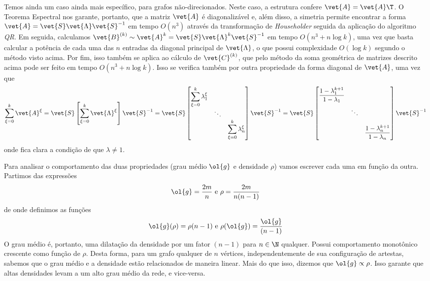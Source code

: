 \documentclass[l15, tikzdraw]{homework}
\begin{document}
	Temos ainda um caso ainda mais específico, para grafos não-direcionados. Neste caso, a estrutura confere $\vet{A} = \vet{A}\T$. O Teorema Espectral nos garante, portanto, que a matriz $\vet{A}$ é diagonalizável e, além disso, a simetria permite encontrar a forma $\vet{A} = \vet{S} \vet{\Lambda} \vet{S}^{-1}$ em tempo $O(n^3)$ através da transformação de \textit{Householder} seguida da aplicação do algoritmo \textit{QR}. Em seguida, calculamos $\vet{B}^{(k)} \sim \vet{A}^k = \vet{S} \vet{\Lambda}^k \vet{S}^{-1}$ em tempo $O(n^3 + n \log k)$, uma vez que basta calcular a potência de cada uma das $n$ entradas da diagonal principal de $\vet{\Lambda}$, o que possui complexidade $O(\log k)$ segundo o método visto acima. Por fim, isso também se aplica ao cálculo de $\vet{C}^{(k)}$, que pelo método da soma geométrica de matrizes descrito acima pode ser feito em tempo $O(n^3 + n \log k)$. Isso se verifica também por outra propriedade da forma diagonal de $\vet{A}$, uma vez que
		$$\sum_{\xi = 0}^{k} \vet{A}^\xi = \vet{S} \left[ \sum_{\xi = 0}^{k} \vet{\Lambda}^\xi \right]\vet{S}^{-1} = \vet{S} \left[ \begin{matrix}%
			\displaystyle \sum_{\xi = 0}^{k} \lambda_1^\xi & ~ & ~ \\
			~ & \ddots & ~ \\
			~ & ~ & \displaystyle \sum_{\xi = 0}^{k} \lambda_n^\xi%
		\end{matrix} \right]\vet{S}^{-1} = \vet{S} \left[ \begin{matrix}%
			\displaystyle \frac{1 - \lambda_1^{k + 1}}{1 - \lambda_1} & ~ & ~ \\[2.5ex]
			~ & \ddots & ~ \\[2.5ex]
			~ & ~ & \displaystyle \frac{1 - \lambda_n^{k + 1}}{1 - \lambda_n}%
		\end{matrix} \right]\vet{S}^{-1}$$
	onde fica clara a condição de que $\lambda \neq 1$.


	Para analisar o comportamento das duas propriedades (grau médio $\ol{g}$ e densidade $\rho$) vamos escrever cada uma em função da outra. Partimos das expressões
		$$\ol{g} = \frac{2m}{n} \text{ e } \rho = \frac{2m}{n (n - 1)}$$
	de onde definimos as funções
		$$\ol{g}(\rho) = \rho (n - 1) \text{ e } \rho(\ol{g})= \frac{\ol{g}}{(n - 1)}$$
	O grau médio é, portanto, uma dilatação da densidade por um fator $(n - 1)$ para $n \in \N$ qualquer. Possui comportamento monotônico crescente como função de $\rho$. Desta forma, para um grafo qualquer de $n$ vértices, independentemente de sua configuração de artestas, sabemos que o grau médio e a densidade estão relacionados de maneira linear. Mais do que isso, dizemos que $\ol{g} \propto \rho$. Isso garante que altas densidades levam a um alto grau médio da rede, e vice-versa. 
\end{document}
